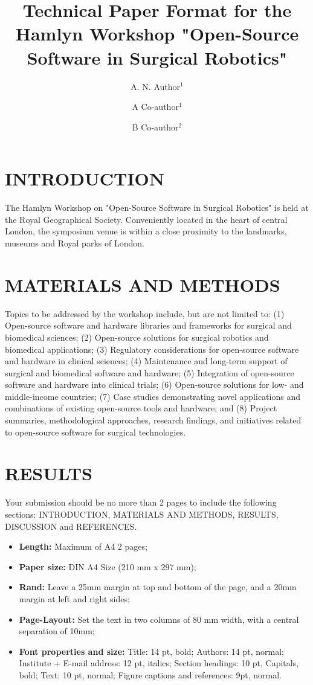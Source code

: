 \documentclass[a4paper, 10 pt, conference]{hsmrw}
\title{\LARGE \bf
Technical Paper Format for the Hamlyn Workshop "Open-Source Software in Surgical Robotics"}
\author{\LARGE A. N. Author$^{1}$}
\author{\LARGE A Co-author$^{1}$}
\author{\LARGE B Co-author$^{2}$}
\affil{\Large\textit{$^{1}$Institute for xxx, University XXX,}\\ \Large\textit{$^{2}$Institute for xxx, University Hospital XXX}\\ \Large\textit{a.n.author@abc.edu}}
\begin{document}
\maketitle
\thispagestyle{empty}
\pagestyle{empty}

\section*{INTRODUCTION}
The Hamlyn Workshop on "Open-Source Software in Surgical Robotics" is held at the Royal Geographical Society. Conveniently located in the heart of central London, the symposium venue is within a close proximity to the landmarks, museums and Royal parks of London. 

\section*{MATERIALS AND METHODS}
Topics to be addressed by the workshop include, but are not limited to:
(1) Open-source software and hardware libraries and frameworks for surgical and biomedical sciences;
(2) Open-source solutions for surgical robotics and biomedical applications;
(3) Regulatory considerations for open-source software and hardware in clinical sciences;
(4) Maintenance and long-term support of surgical and biomedical software and hardware;
(5) Integration of open-source software and hardware into clinical trials;
(6) Open-source solutions for low- and middle-income countries;
(7) Case studies demonstrating novel applications and combinations of existing open-source tools and hardware; and
(8) Project summaries, methodological approaches, research findings, and initiatives related to open-source software for surgical technologies.


\section*{RESULTS}
Your submission should be no more than 2 pages to include the following sections: INTRODUCTION, MATERIALS AND METHODS, RESULTS, DISCUSSION and REFERENCES.
\begin{itemize}
    \item \textbf{Length:} Maximum of A4 2 pages;
    \item \textbf{Paper size:} DIN A4 Size (210 mm x 297 mm);
    \item \textbf{Rand:} Leave a 25mm margin at top and bottom of the page, and a 20mm margin at left and right sides;
    \item \textbf{Page-Layout:} Set the text in two columns of 80 mm width, with a central separation of 10mm;
    \item \textbf{Font properties and size:} Title: 14 pt, bold; Authors: 14 pt, normal; Institute + E-mail address: 12 pt, italics; Section headings: 10 pt, Capitals, bold; Text: 10 pt, normal; Figure captions and references: 9pt, normal.
\end{itemize}
\end{document}
